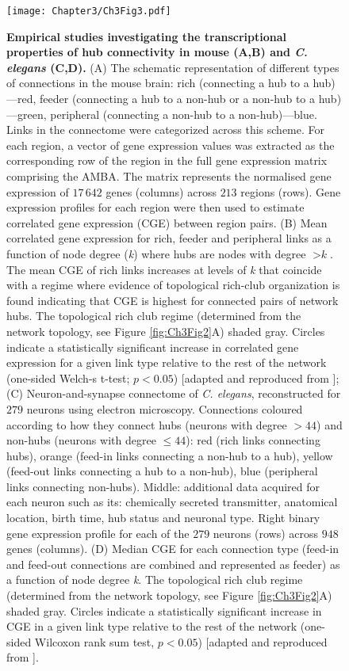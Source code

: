 \begin{figure}[!h]
\begin{center}
\texttt{[image: Chapter3/Ch3Fig3.pdf]}%
\end{center}
\caption{\textbf{Empirical studies investigating the transcriptional properties of hub connectivity in mouse (A,B) and \textit{C. elegans} (C,D).}
(A) The schematic representation of different types of connections in the mouse brain: rich (connecting a hub to a hub)---red, feeder (connecting a hub to a non-hub or a non-hub to a hub)---green, peripheral (connecting a non-hub to a non-hub)---blue. Links in the connectome were categorized across this scheme. For each region, a vector of gene expression values was extracted as the corresponding row of the region in the full gene expression matrix comprising the AMBA. The matrix represents the normalised gene expression of $17\,642$ genes (columns) across $213$ regions (rows). Gene expression profiles for each region were then used to estimate correlated gene expression (CGE) between region pairs.
(B) Mean correlated gene expression for rich, feeder and peripheral links as a function of node degree (\textit{k}) where hubs are nodes with degree $> \textit{k}$. The mean CGE of rich links increases at levels of \textit{k} that coincide with a regime where evidence of topological rich-club organization is found indicating that CGE is highest for connected pairs of network hubs. The topological rich club regime (determined from the network topology, see Figure \ref{fig:Ch3Fig2}A) shaded gray. Circles indicate a statistically significant increase in correlated gene expression for a given link type relative to the rest of the network (one-sided Welch-s t-test; $p < 0.05$) [adapted and reproduced from \citet{Fulcher2016}];
(C) Neuron-and-synapse connectome of \textit{C. elegans}, reconstructed for $279$ neurons using electron microscopy. Connections coloured according to how they connect hubs (neurons with degree $> 44$) and non-hubs (neurons with degree $≤ 44$): red (rich links connecting hubs), orange (feed-in links connecting a non-hub to a hub), yellow (feed-out links connecting a hub to a non-hub), blue (peripheral links connecting non-hubs). Middle: additional data acquired for each neuron such as its: chemically secreted transmitter, anatomical location, birth time, hub status and neuronal type. Right binary gene expression profile for each of the $279$ neurons (rows) across $948$ genes (columns).
(D) Median CGE for each connection type (feed-in and feed-out connections are combined and represented as feeder) as a function of node degree \textit{k}. The topological rich club regime (determined from the network topology, see Figure \ref{fig:Ch3Fig2}A) shaded gray.
Circles indicate a statistically significant increase in CGE in a given link type relative to the rest of the network (one-sided Wilcoxon rank sum test, $p < 0.05$) [adapted and reproduced from \citet{Arnatkeviciute2018}]. } \label{fig:Ch3Fig3}
\end{figure}


